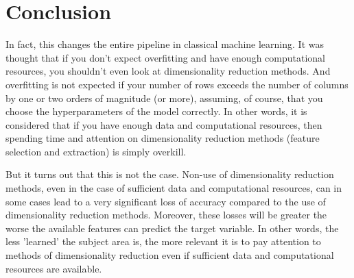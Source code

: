 \documentclass[12pt]{a&t}
\begin{document}
\section{Conclusion}
In fact, this changes the entire pipeline in classical machine learning. It was thought that if you don't expect overfitting and have enough computational resources, you shouldn't even look at dimensionality reduction methods. And overfitting is not expected if your number of rows exceeds the number of columns by one or two orders of magnitude (or more), assuming, of course, that you choose the hyperparameters of the model correctly. In other words, it is considered that if you have enough data and computational resources, then spending time and attention on dimensionality reduction methods (feature selection and extraction) is simply overkill. 

But it turns out that this is not the case. Non-use of dimensionality reduction methods, even in the case of sufficient data and computational resources, can in some cases lead to a very significant loss of accuracy compared to the use of dimensionality reduction methods. Moreover, these losses will be greater the worse the available features can predict the target variable. In other words, the less 'learned' the subject area is, the more relevant it is to pay attention to methods of dimensionality reduction even if sufficient data and computational resources are available.
\end{document}

